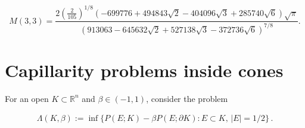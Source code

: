\documentclass[10pt,reqno]{amsart}
\numberwithin{equation}{section}
\theoremstyle{definition}
\newcommand{\R}{\mathbb{R}}
\begin{document}
{{\[
M(3,3) = \frac{2\left(\frac{2}{105}\right)^{1 / 8}\left(-699776+494843 \sqrt{2}-404096 \sqrt{3}+285740 \sqrt{6}\right) \sqrt{\pi}}{\left(913063-645632 \sqrt{2}+527138 \sqrt{3}-372736 \sqrt{6}\right)^{7 / 8}}.
\]





\section{Capillarity problems inside cones}\label{sec:cap}

For an open $K\subset \R^n$ and $\beta \in (-1,1)$, consider the problem


\begin{align}\label{eq:cap inside Lawson}
   \Lambda(K,\beta):= \inf\{P(E;K) - \beta P(E;\partial K) : E \subset K,\, |E|=1/2  \}\,.
\end{align}

}}
\end{document}
